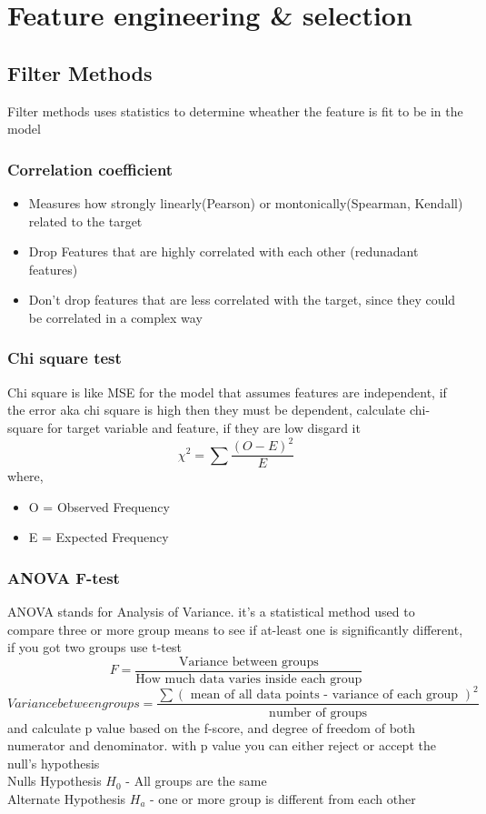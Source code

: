 \documentclass[12pt]{extarticle}
\begin{document}
\section{Feature engineering \& selection}

\subsection{Filter Methods}
Filter methods uses statistics to determine wheather the feature is fit to be
in the model 

\subsubsection{Correlation coefficient}
\begin{itemize}
    \item Measures how strongly linearly(Pearson) or montonically(Spearman, Kendall) related
to the target
    \item Drop Features that are highly correlated with each other (redunadant features)
    \item Don't drop features that are less correlated with the target, since they could be 
        correlated in a complex way 
\end{itemize}

\subsubsection{Chi square test}
Chi square is like MSE for the model that assumes features are independent, 
if the error aka chi square is high then they must be dependent, calculate
chi-square for target variable and feature, if they are low disgard it
$$ \chi^2 = \sum \frac{(O-E)^2}{E} $$
where,
\begin{itemize}
    \item O = Observed Frequency
    \item E = Expected Frequency 
\end{itemize}

\subsubsection{ANOVA F-test}
ANOVA stands for Analysis of Variance. it's a statistical method used to 
compare three or more group means to see if at-least one is significantly 
different, if you got two groups use t-test
$$F = \frac{\text{Variance between groups}}{\text{How much data varies inside each group}}$$
$$ Variance between groups = 
\frac{\sum(\text{ mean of all data points - variance of each group })^2}{\text{number of groups}} $$
and calculate p value based on the f-score, and degree of freedom of both numerator and 
denominator. with p value you can either reject or accept the null's hypothesis \\
Nulls Hypothesis $H_0$ - All groups are the same\\
Alternate Hypothesis $H_a$ - one or more group is different from each other
\end{document}
